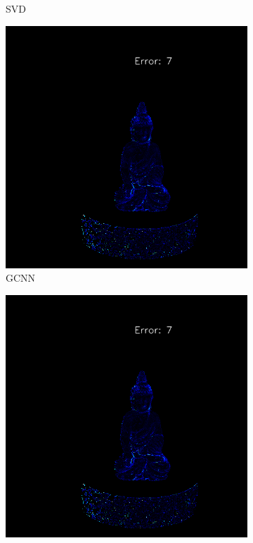 \begin{figure}[H]
\begin{subfigure}[b]{0.24\linewidth}
		\caption{SVD}
	\end{subfigure}	
	\begin{subfigure}[b]{0.24\linewidth}
		\includegraphics[width=\linewidth]{./Figures/comparison_real/fancy_eval_0_error_NNNN-512.png}
		\caption{GCNN}
	\end{subfigure}
	\begin{subfigure}[b]{0.24\linewidth}
		\includegraphics[width=\linewidth]{./Figures/comparison_real/fancy_eval_0_error_An2-real-resume.png}

\end{subfigure}
\end{figure}
